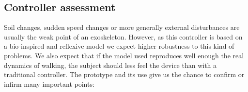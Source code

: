 \documentclass[a4paper,12pt]{article}
\begin{document}
\subsection{Controller assessment}
\label{controllerassessment}

Soil changes, sudden speed changes or more generally external disturbances are usually the weak point of an exoskeleton. 
However, as this controller is based on a bio-inspired and reflexive model we expect higher robustness to this kind of problems. We also expect that if the model used reproduces well enough the real dynamics of walking, the subject should less feel the device than with a traditional controller. The prototype and its use give us the chance to confirm or infirm many important points:
\end{document}
